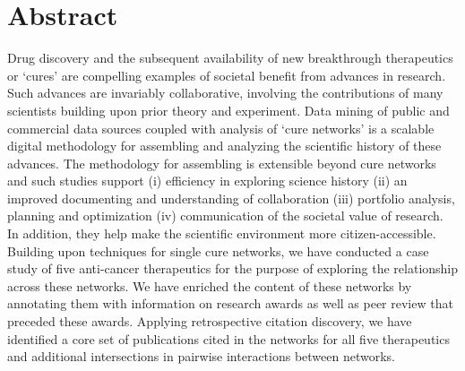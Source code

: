 \documentclass[10pt,letterpaper]{article}
\begin{document}
\section*{Abstract}

Drug discovery and the subsequent availability of new breakthrough therapeutics or `cures' are compelling examples of societal benefit from advances in research. Such advances are invariably collaborative, involving the contributions of many scientists building upon prior theory and experiment. Data mining of public and commercial data sources coupled with analysis of `cure networks' is a scalable digital methodology for assembling and analyzing the scientific history of these advances. The methodology for assembling is extensible beyond cure networks and such studies support (i) efficiency in  exploring  science history (ii) an improved documenting and understanding of collaboration (iii) portfolio analysis, planning and optimization (iv) communication of the societal value of research. In addition, they help make the scientific environment more citizen-accessible. Building upon techniques for single cure networks, we have conducted a case study of five anti-cancer therapeutics for the purpose of exploring the relationship across these networks. We have enriched the content of these networks by annotating them with information on research awards as well as peer review that preceded these awards. Applying retrospective citation discovery, we have identified a core set of publications cited in the networks for all five therapeutics and additional intersections in pairwise interactions between networks.

\end{document}
